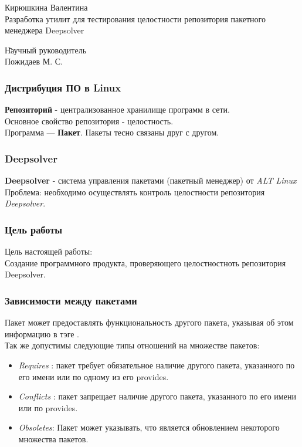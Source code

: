 \documentclass{beamer}
\begin{document}
\begin{frame}
\begin{center}
Кирюшкина Валентина\\
\vspace{1cm}
{\Large Разработка утилит для тестирования целостности репозитория пакетного менеджера Deepsolver}
\end{center}
\begin{tabbing}
\hspace{6.5cm} \= Научный руководитель\\
\> Пожидаев М. С.\\
\end{tabbing}
\end{frame}

\begin{frame}
\frametitle{Дистрибуция ПО в Linux}
\textbf{Репозиторий} - централизованное хранилище программ в сети.\\
Основное свойство репозитория - целостность.\\
Программа --- \textbf{Пакет}. Пакеты тесно связаны друг с другом.

\end{frame}

\begin{frame}
\frametitle{Deepsolver}
\textbf{Deepsolver} - система управления пакетами (пакетный менеджер) от \textit{ALT Linux}\\
Проблема: необходимо осуществлять контроль целостности репозитория \textit{Deepsolver}. 

\end{frame}

\begin{frame}
\frametitle{Цель работы}
Цель настоящей работы:\\
Создание  программного 
продукта, проверяющего целостностноть репозитория Deepsolver.

\end{frame}

\begin{frame}
\frametitle{Зависимости между пакетами}
 Пакет может предоставлять функциональность другого пакета, указывая об 
этом информацию в тэге . \\
Так же допустимы следующие типы отношений на множестве пакетов:
\begin{itemize}
\item
\textit{Requires} : пакет требует обязательное наличие другого пакета, указанного 
по его имени или по одному из его provides.
\item
\textit{Conflicts} :
пакет запрещает наличие другого пакета, указанного по его имени или по
provides.
\item 
\textit{Obsoletes}: Пакет может указывать, что является обновлением некоторого 
множества пакетов. 
\end{itemize}

\end{frame}
\end{document}
